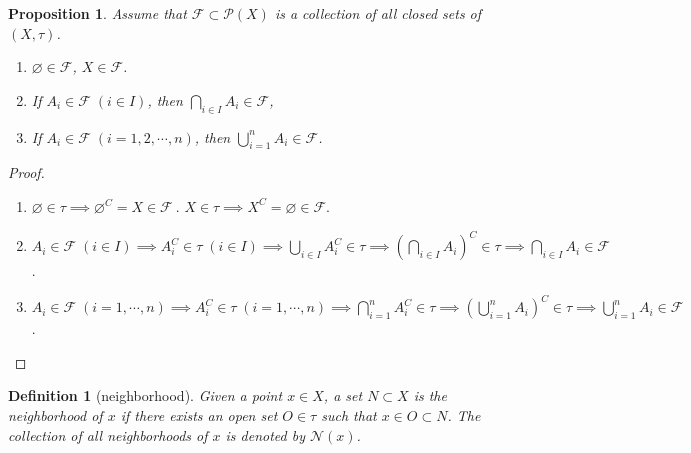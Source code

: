 \documentclass{report}
\newtheorem{definition}{Definition}[section]
\newtheorem{proposition}{Proposition}[section]
\theoremstyle{nonumberplain}
\newtheorem{proof}{Proof.}
\begin{document}
\begin{proposition}
	Assume that $\mathcal{F}\subset\mathcal{P}(X)$ is a collection of all closed sets of $(X,\tau)$.
	\begin{enumerate}
		\item $\varnothing\in \mathcal{F}$, $X\in \mathcal{F}$.
		\item If $A_i\in\mathcal{F}\;(i\in I)$, then $\bigcap\limits_{i\in I}A_i\in \mathcal{F}$,
		\item If $A_i\in\mathcal{F}\;(i=1,2,\cdots,n)$, then $\bigcup\limits_{i=1}^nA_i\in \mathcal{F}$.
	\end{enumerate}
\end{proposition}
\begin{proof}~\\
	\begin{enumerate}
		\item \vspace{-1em}$\varnothing\in \tau\implies\varnothing^C=X\in \mathcal{F} \ $. $X\in \tau\implies X^C=\varnothing\in \mathcal{F}$.
		\item $A_i\in\mathcal{F}\;(i\in I)\implies A_i^C\in\tau\;(i\in I)\implies\bigcup\limits_{i\in I}A_i^C\in \tau\implies \left(\bigcap\limits_{i\in I}A_i\right)^C\in \tau\implies\bigcap\limits_{i\in I}A_i\in\mathcal{F}$.
		\item $A_i\in\mathcal{F}\;(i=1,\cdots,n)\implies A_i^C\in\tau\;(i=1,\cdots,n)\implies\bigcap\limits_{i=1}^nA_i^C\in \tau\implies \left(\bigcup\limits_{i=1}^nA_i\right)^C\in \tau\implies\bigcup\limits_{i=1}^nA_i\in\mathcal{F}$.
	\end{enumerate}
\end{proof}

\begin{definition}[neighborhood]
	Given a point $x\in X$, a set $N\subset X$ is the \emph{neighborhood} of $x$ if there exists an open set $O\in\tau$ such that $x\in O\subset N$. The collection of all neighborhoods of $x$ is denoted by $\mathcal{N}(x)$.
\end{definition}
\end{document}
